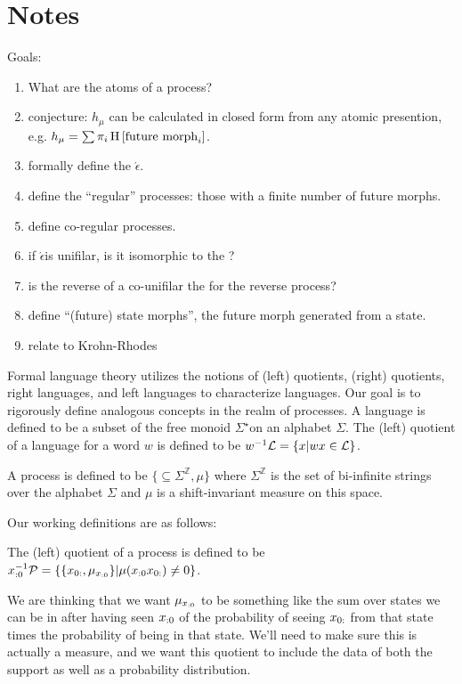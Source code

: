 \documentclass[prl,twocolumn,showpacs,superscriptaddress,preprintnumbers,floatfix]{revtex4-1}
\newcommand{\etomata}{\ensuremath{\acute{\epsilon}}\text{tomata}}
\begin{document}
\section{Notes}

Goals:
\begin{enumerate}
  \item What are the atoms of a process?
  \item conjecture: $h_\mu$ can be calculated in closed form from any atomic
    presention, e.g. $h_\mu = \sum \pi_i \operatorname{H}\left[\textrm{future morph}_i\right]$.
  \item formally define the \etomata.
  \item define the ``regular'' processes: those with a finite number of future
    morphs.
  \item define co-regular processes.
  \item if \etomata is unifilar, is it isomorphic to the \eM?
  \item is the reverse of a co-unifilar \eM the \eM for the reverse
    process?
  \item define ``(future) state morphs'', the future morph generated from a
    state.
  \item relate to Krohn-Rhodes
\end{enumerate}

Formal language theory utilizes the notions of (left) quotients, (right)
quotients, right languages, and left languages to characterize languages. Our
goal is to rigorously define analogous concepts in the realm of processes. A
language \Language is defined to be a subset of the free monoid
$\Sigma^{\star}$on an alphabet $\Sigma$. The (left) quotient of a language
\Language for a word $w$ is defined to be $w^{-1}\mathcal{L} = \{ x | wx \in
\mathcal{L} \}$.

A process \Process is defined to be $\{\subseteq \Sigma^{\mathbb{Z}}, \mu\}$
where $\Sigma^{\mathbb{Z}}$ is the set of bi-infinite strings over the alphabet
$\Sigma$ and $\mu$ is a shift-invariant measure on this space.

Our working definitions are as follows:

The (left) quotient of a process \Process is defined to be ${x}_{:0}^{-1} \mathcal{P} =
\{ \{ {x}_{0:}, \mu_{{x}_{:0}} \} | \mu({x}_{:0} {x}_{0:}) \neq 0 \}$.

We are thinking that we want $\mu_{{x}_{:0}}$ to be something like the sum over
states we can be in after having seen ${x}_{:0}$ of the probability of seeing
${x}_{0:}$ from that state times the probability of being in that state.
We'll need to make sure this is actually a measure, and we want this quotient to
include the data of both the support as well as a probability distribution.
\end{document}
